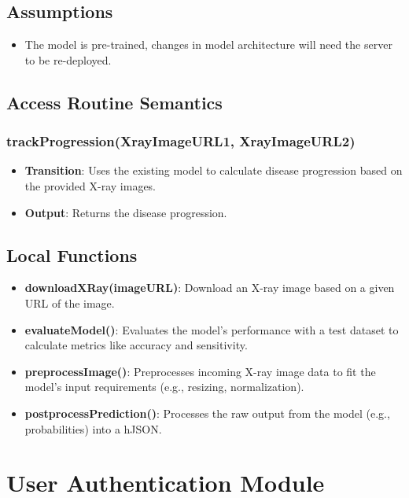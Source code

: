 \documentclass[12pt, titlepage]{article}
\begin{document}
\subsection{Assumptions}
\begin{itemize}
    \item The model is pre-trained, changes in model architecture will need the server to be re-deployed.
\end{itemize}

\subsection{Access Routine Semantics}
\subsubsection{trackProgression(XrayImageURL1, XrayImageURL2)}
\begin{itemize}
    \item \textbf{Transition}: Uses the existing model to calculate disease progression based on the provided X-ray images.
    \item \textbf{Output}: Returns the disease progression.
\end{itemize}

\subsection{Local Functions}
\begin{itemize}
    \item \textbf{downloadXRay(imageURL)}: Download an X-ray image based on a given URL of the image.
    \item \textbf{evaluateModel()}: Evaluates the model’s performance with a test dataset to calculate metrics like accuracy and sensitivity.
    \item \textbf{preprocessImage()}: Preprocesses incoming X-ray image data to fit the model's input requirements (e.g., resizing, normalization).
    \item \textbf{postprocessPrediction()}: Processes the raw output from the model (e.g., probabilities) into a hJSON.
\end{itemize}

\section{User Authentication Module}
\end{document}
